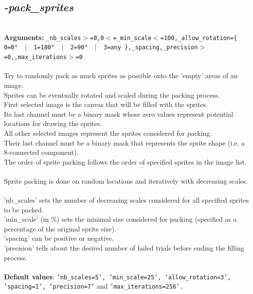 \documentclass[a4paper,11pt,twoside]{book}
\begin{document}
\subsection{\emph{-pack\_sprites} }\vspace*{-0.5em}
~\\\textbf{Arguments: } 
{\small \texttt{\_nb\_scales$>$=0,0$<$=\_min\_scale$<$=100,\_allow\_rotation=\{ 0=0° ~$|$~ 1=180° ~$|$~ 2=90° ~$|$~ 3=any \},\_spacing,\_precision$>$=0,,max\_iterations$>$=0}}\\~\\
Try to randomly pack as much sprites as possible onto the 'empty' areas of an image.
~\\Sprites can be eventually rotated and scaled during the packing process.
~\\First selected image is the canvas that will be filled with the sprites.
~\\Its last channel must be a binary mask whose zero values represent potential locations for drawing the sprites.
~\\All other selected images represent the sprites considered for packing.
~\\Their last channel must be a binary mask that represents the sprite shape (i.e. a 8-connected component).
~\\The order of sprite packing follows the order of specified sprites in the image list.
~\\Sprite packing is done on random locations and iteratively with decreasing scales.
~\\'nb\_scales' sets the number of decreasing scales considered for all specified sprites to be packed.
~\\'min\_scale' (in \%) sets the minimal size considered for packing (specified as a percentage of the original sprite size).
~\\'spacing' can be positive or negative.
~\\'precision' tells about the desired number of failed trials before ending the filling process.
~\\~\\\textbf{Default values}: {\small \texttt{'nb\_scales=5', 'min\_scale=25', 'allow\_rotation=3', 'spacing=1', 'precision=7'} and \texttt{'max\_iterations=256'.}}
\end{document}
